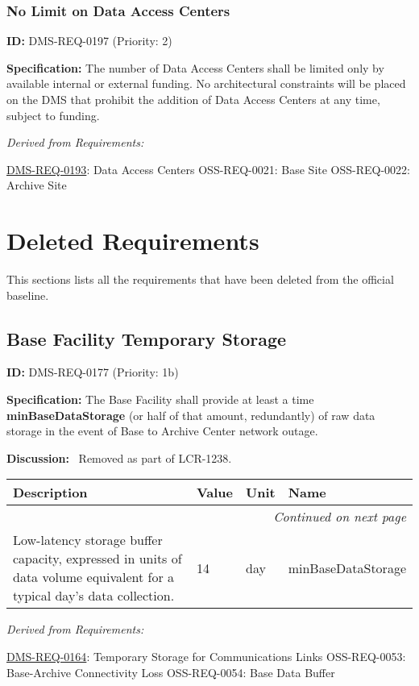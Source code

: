 \documentclass[SE,toc,lsstdraft]{lsstdoc}
\makeatletter
\newcommand{\paramname}[1]{\hspace{0pt}#1}
\newcommand{\unitname}[1]{\hspace{0pt}#1}
\newenvironment{parameters}[0]{%
\setlength\LTleft{0pt}
\setlength\LTright{\fill}
\begin{small}
\begin{longtable}[]{|p{0.49\textwidth}|l|p{0.6in}|p{1.70in}@{}|}

\hline \textbf{Description} & \textbf{Value} & \textbf{Unit} & \textbf{Name} \\ \hline
\endhead

\hline \multicolumn{4}{r}{\emph{Continued on next page}} \\
\endfoot

\hline\hline
\endlastfoot
}{%
\hline
\end{longtable}
\end{small}
}
\makeatother
\begin{document}
\subsubsection{No Limit on Data Access Centers}

\label{DMS-REQ-0197}
\textbf{ID:} DMS-REQ-0197 (Priority: 2)

\textbf{Specification: }The number of Data Access Centers shall be limited only by available internal or external funding.  No architectural constraints will be placed on the DMS that prohibit the addition of Data Access Centers at any time, subject to funding.

\emph{Derived from Requirements:}

\hyperref[DMS-REQ-0193]{DMS-REQ-0193}:
Data Access Centers \newline
OSS-REQ-0021:
Base Site \newline
OSS-REQ-0022:
Archive Site \newline

\section{Deleted Requirements}

This sections lists all the requirements that have been deleted from the official baseline.

\subsection{Base Facility Temporary Storage}

\label{DMS-REQ-0177}
\textbf{ID:} DMS-REQ-0177 (Priority: 1b)

\textbf{Specification:} The Base Facility shall provide at least a time \textbf{minBaseDataStorage }(or half of that amount, redundantly) of raw data storage in the event of Base to Archive Center network outage.

\textbf{Discussion:}
 Removed as part of LCR-1238.

\begin{parameters}
Low-latency storage buffer capacity, expressed in units of data volume equivalent for a typical day's data collection.
&
14
&
\unitname{%
day
}
&
\paramname{%
minBaseDataStorage
} \\\hline
\end{parameters}

\emph{Derived from Requirements:}

\hyperref[DMS-REQ-0164]{DMS-REQ-0164}:
Temporary Storage for Communications Links \newline
OSS-REQ-0053:
Base-Archive Connectivity Loss \newline
OSS-REQ-0054:
Base Data Buffer \newline
\end{document}
